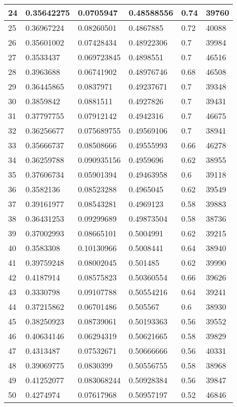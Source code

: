 \begin{longtable}{|l|l|l|l|l|l|}
24 & 0.35642275 & 0.0705947 & 0.48588556 & 0.74 & 39760 \\ \hline 
25 & 0.36967224 & 0.08260501 & 0.4867885 & 0.72 & 40088 \\ \hline 
26 & 0.35601002 & 0.07428434 & 0.48922306 & 0.7 & 39984 \\ \hline 
27 & 0.3533437 & 0.069723845 & 0.4898551 & 0.7 & 46516 \\ \hline 
28 & 0.3963688 & 0.06741902 & 0.48976746 & 0.68 & 46508 \\ \hline 
29 & 0.36445865 & 0.0837971 & 0.49237671 & 0.7 & 39348 \\ \hline 
30 & 0.3859842 & 0.0881511 & 0.4927826 & 0.7 & 39431 \\ \hline 
31 & 0.37797755 & 0.07912142 & 0.4942316 & 0.7 & 46675 \\ \hline 
32 & 0.36256677 & 0.075689755 & 0.49569106 & 0.7 & 38941 \\ \hline 
33 & 0.35666737 & 0.08508666 & 0.49555993 & 0.66 & 46278 \\ \hline 
34 & 0.36259788 & 0.090935156 & 0.4959696 & 0.62 & 38955 \\ \hline 
35 & 0.37606734 & 0.05901394 & 0.49463958 & 0.6 & 39118 \\ \hline 
36 & 0.3582136 & 0.08523288 & 0.4965045 & 0.62 & 39549 \\ \hline 
37 & 0.39161977 & 0.08543281 & 0.4969123 & 0.58 & 39883 \\ \hline 
38 & 0.36431253 & 0.09299689 & 0.49873504 & 0.58 & 38736 \\ \hline 
39 & 0.37002993 & 0.08665101 & 0.5004991 & 0.62 & 39215 \\ \hline 
40 & 0.3583308 & 0.10130966 & 0.5008441 & 0.64 & 38940 \\ \hline 
41 & 0.39759248 & 0.08002045 & 0.501485 & 0.62 & 39990 \\ \hline 
42 & 0.4187914 & 0.08575823 & 0.50360554 & 0.66 & 39626 \\ \hline 
43 & 0.3330798 & 0.09107788 & 0.50554216 & 0.64 & 39241 \\ \hline 
44 & 0.37215862 & 0.06701486 & 0.505567 & 0.6 & 38930 \\ \hline 
45 & 0.38250923 & 0.08739061 & 0.50193363 & 0.56 & 39552 \\ \hline 
46 & 0.40634146 & 0.06294319 & 0.50621665 & 0.58 & 39829 \\ \hline 
47 & 0.4313487 & 0.07532671 & 0.50666666 & 0.56 & 40331 \\ \hline 
48 & 0.39069775 & 0.0830399 & 0.50556755 & 0.58 & 38968 \\ \hline 
49 & 0.41252077 & 0.083068244 & 0.50928384 & 0.56 & 39847 \\ \hline 
50 & 0.4274974 & 0.07617968 & 0.50957197 & 0.52 & 46846 \\ \hline 
\end{longtable}